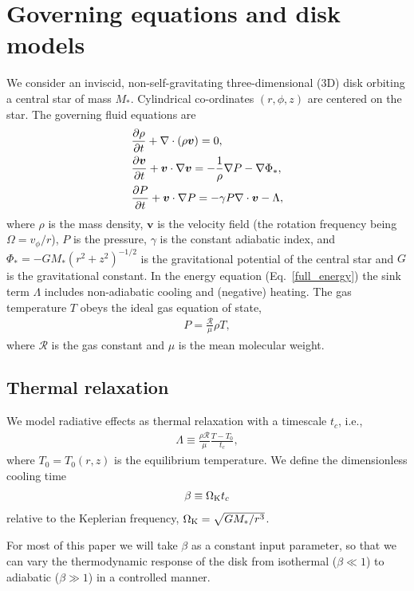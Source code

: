 \section{Governing equations and disk models}\label{setup}
We consider  an inviscid, non-self-gravitating three-dimensional (3D)
disk orbiting a central star of mass $M_*$.  Cylindrical
co-ordinates $(r,\phi, z)$ are centered on the star. The governing fluid equations are
\begin{align}
  &\frac{\p\rho}{\p t} + \nabla\cdot{\left(\rho\bm{v}\right)} = 0,\label{full_mass}\\
  &\frac{\p\bm{v}}{\p t} + \bm{v}\cdot\nabla\bm{v} =
  -\frac{1}{\rho}\nabla P - \nabla\Phi_*,\\
  &\frac{\p P}{\p t} + \bm{v}\cdot\nabla P  = - \gamma P
  \nabla\cdot\bm{v} - \Lambda %
  , \label{full_energy}
\end{align}
where $\rho$ is the mass density, $\bm{v}$ is the velocity field (the
rotation frequency being $\Omega=v_\phi/r$), $P$
is the pressure, $\gamma$ is the constant adiabatic index, and $\Phi_*
= -GM_*(r^2 + z^2)^{-1/2}$ is the gravitational potential of the
central star and $G$ is the gravitational constant. 
In the energy equation (Eq.\ \ref{full_energy}) the sink term
$\Lambda$ includes non-adiabatic cooling and (negative) heating. 
The gas temperature $T$ obeys the ideal gas 
equation of state,  
\begin{align}
P = \frac{\mathcal{R}}{\mu}\rho T,
\end{align}
where $\mathcal{R}$ is the gas constant and $\mu$ is the mean molecular
weight.    

\subsection{Thermal relaxation}
We model radiative effects as thermal
relaxation with a timescale $t_c$, i.e.,
\begin{align}\label{thermal_relax}
  \Lambda  \equiv \frac{\rho\mathcal{R}}{\mu}\frac{T - T_0}{t_c},
\end{align}
where $T_0=T_0(r,z)$ is the equilibrium temperature.  We 
define the dimensionless cooling time 
\begin{align}\label{beta_def}
  \beta \equiv \Omega_{\rm K} t_c
\end{align}
relative to the Keplerian frequency, $\Omega_{\rm K}=\sqrt{GM_*/r^3}$.   

For most of this paper we will take $\beta$ as a constant input
parameter, so that we can vary the thermodynamic response of the
disk from isothermal ($\beta\ll 1$) to adiabatic ($\beta \gg 1$) in a
controlled manner. 

